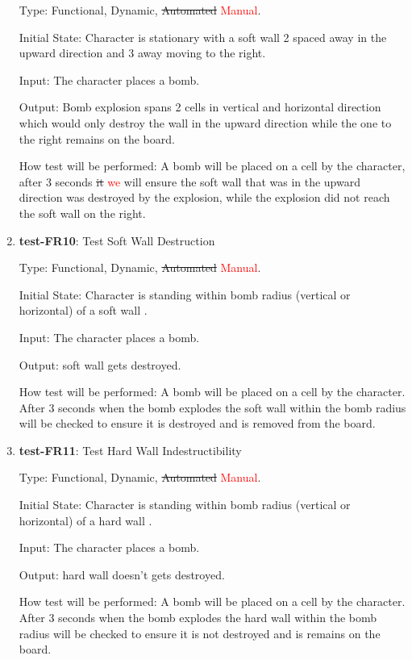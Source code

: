 \documentclass[12pt, titlepage]{article}
\begin{document}
\begin{enumerate}
Type: Functional, Dynamic, \st{Automated} \textcolor{red}{Manual}.
					
Initial State: Character is stationary with a soft wall 2 spaced away in the upward direction and 3 away moving to the right.
					
Input: The character places a bomb.
					
Output: Bomb explosion spans 2 cells in vertical and horizontal direction which would only destroy the wall in the upward direction while the one to the right remains on the board.
					
How test will be performed: A bomb will be placed on a cell by the character, after 3 seconds \st{it} \textcolor{red}{we} will ensure the soft wall that was in the upward direction was destroyed by the explosion, while the explosion did not reach the soft wall on the right.

\item{\textbf{test-FR10}: Test Soft Wall Destruction\\}

Type: Functional, Dynamic, \st{Automated} \textcolor{red}{Manual}.
					
Initial State: Character is standing within bomb radius (vertical or horizontal) of a soft wall .
					
Input: The character places a bomb.
					
Output: soft wall gets destroyed.
					
How test will be performed: A bomb will be placed on a cell by the character. After 3 seconds when the bomb explodes the soft wall within the bomb radius will be checked to ensure it is destroyed and is removed from the board.

\item{\textbf{test-FR11}: Test Hard Wall Indestructibility\\} 

Type: Functional, Dynamic, \st{Automated} \textcolor{red}{Manual}.
					
Initial State: Character is standing within bomb radius (vertical or horizontal) of a hard wall .
					
Input: The character places a bomb.
					
Output: hard wall doesn't gets destroyed.
					
How test will be performed: A bomb will be placed on a cell by the character. After 3 seconds when the bomb explodes the hard wall within the bomb radius will be checked to ensure it is not destroyed and is remains on the board.


\end{enumerate}
\end{document}
